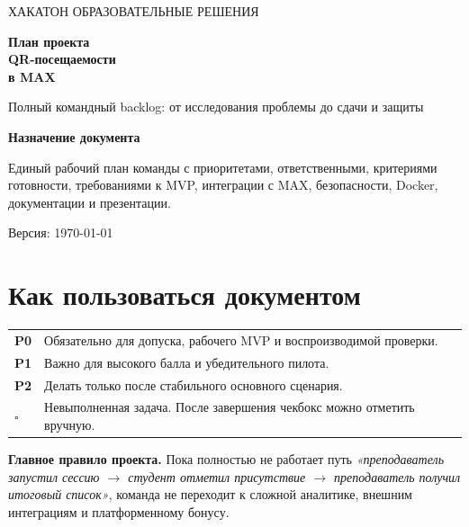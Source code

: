 \documentclass[11pt,a4paper]{article}
\newcommand{\PZero}{\textcolor{PZero}{\textbf{P0}}}
\newcommand{\POne}{\textcolor{POne}{\textbf{P1}}}
\newcommand{\PTwo}{\textcolor{PTwo}{\textbf{P2}}}
\begin{document}
\begin{titlepage}
  \pagecolor{MaxPurple}
  \color{white}
  \vspace*{18mm}
  {\fontsize{15}{18}\selectfont ХАКАТОН \textbullet{} ОБРАЗОВАТЕЛЬНЫЕ РЕШЕНИЯ}\par
  \vspace{22mm}
  {\fontsize{34}{40}\selectfont\bfseries План проекта\\QR-посещаемости\\в MAX}\par
  \vspace{8mm}
  {\Large Полный командный backlog: от исследования проблемы до сдачи и защиты}\par
  \vfill
  \begin{tcolorbox}[colback=white,colframe=white,arc=3mm,boxrule=0pt]
    \color{Ink}
    \textbf{Назначение документа}\par
    Единый рабочий план команды с приоритетами, ответственными, критериями готовности, требованиями к MVP, интеграции с MAX, безопасности, Docker, документации и презентации.
  \end{tcolorbox}
  \vspace{10mm}
  {\large Версия: \today}\par
\end{titlepage}
\nopagecolor
\color{Ink}

\tableofcontents
\newpage

\section*{Как пользоваться документом}

\begin{summarybox}
\begin{tabularx}{\textwidth}{>{\bfseries}p{18mm}X}
\PZero & Обязательно для допуска, рабочего MVP и воспроизводимой проверки.\\
\POne & Важно для высокого балла и убедительного пилота.\\
\PTwo & Делать только после стабильного основного сценария.\\
$\square$ & Невыполненная задача. После завершения чекбокс можно отметить вручную.\\
\end{tabularx}
\end{summarybox}

\begin{warningbox}
\textbf{Главное правило проекта.} Пока полностью не работает путь
\emph{«преподаватель запустил сессию $\rightarrow$ студент отметил присутствие $\rightarrow$ преподаватель получил итоговый список»}, команда не переходит к сложной аналитике, внешним интеграциям и платформенному бонусу.
\end{warningbox}
\end{document}
